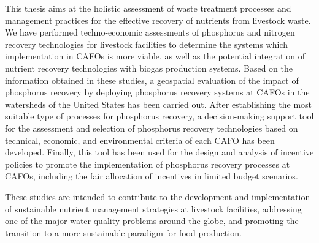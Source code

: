 This thesis aims at the holistic assessment of waste treatment processes and management practices for the effective recovery of nutrients from livestock waste. We have performed techno-economic assessments of phosphorus and nitrogen recovery technologies for livestock facilities to determine the systems which implementation in CAFOs is more viable, as well as the potential integration of nutrient recovery technologies with biogas production systems. Based on the information obtained in these studies, a geospatial evaluation of the impact of phosphorus recovery by deploying phosphorus recovery systems at CAFOs in the watersheds of the United States has been carried out. After establishing the most suitable type of processes for phosphorus recovery, a decision-making support tool for the assessment and selection of phosphorus recovery technologies based on technical, economic, and environmental criteria of each CAFO has been developed. Finally, this tool has been used for the design and analysis of incentive policies to promote the implementation of phosphorus recovery processes at CAFOs, including the fair allocation of incentives in limited budget scenarios.

These studies are intended to contribute to the development and implementation of sustainable nutrient management strategies at livestock facilities, addressing one of the major water quality problems around the globe, and promoting the transition to a more sustainable paradigm for food production.



\cleardoublepage

